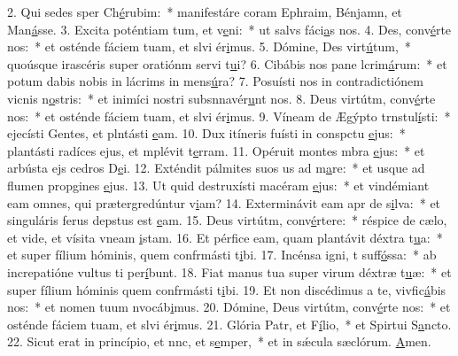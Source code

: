 2. Qui sedes sper Ch\uline{é}rubim:~* manifestáre coram Ephraim, Bénjamn, et Man\uline{á}sse.
3. Excita poténtiam tum, et v\uline{e}ni:~* ut salvs fáci\uline{a}s nos.
4. Des, conv\uline{é}rte nos:~* et osténde fáciem tuam, et slvi ér\uline{i}mus.
5. Dómine, Des virt\uline{ú}tum,~* quoúsque irascéris super oratiónm servi t\uline{u}i?
6. Cibábis nos pane lcrim\uline{á}rum:~* et potum dabis nobis in lácrims in mens\uline{ú}ra?
7. Posuísti nos in contradictiónem vicnis n\uline{o}stris:~* et inimíci nostri subsnnavér\uline{u}nt nos.
8. Deus virtútm, conv\uline{é}rte nos:~* et osténde fáciem tuam, et slvi ér\uline{i}mus.
9. Víneam de Ægýpto trnstul\uline{í}sti:~* ejecísti Gentes, et plntásti \uline{e}am.
10. Dux itíneris fuísti in conspctu \uline{e}jus:~* plantásti radíces ejus, et mplévit t\uline{e}rram.
11. Opéruit montes mbra \uline{e}jus:~* et arbústa ejs cedros D\uline{e}i.
12. Exténdit pálmites suos us ad m\uline{a}re:~* et usque ad flumen propgines \uline{e}jus.
13. Ut quid destruxísti macéram \uline{e}jus:~* et vindémiant eam omnes, qui prætergredúntur v\uline{i}am?
14. Exterminávit eam apr de s\uline{i}lva:~* et singuláris ferus depstus est \uline{e}am.
15. Deus virtútm, conv\uline{é}rtere:~* réspice de cælo, et vide, et vísita vneam \uline{i}stam.
16. Et pérfice eam, quam plantávit déxtra t\uline{u}a:~* et super fílium hóminis, quem confrmásti t\uline{i}bi.
17. Incénsa igni, t suff\uline{ó}ssa:~* ab increpatióne vultus ti per\uline{í}bunt.
18. Fiat manus tua super virum déxtræ t\uline{u}æ:~* et super fílium hóminis quem confrmásti t\uline{i}bi.
19. Et non discédimus a te, vivfic\uline{á}bis nos:~* et nomen tuum nvocáb\uline{i}mus.
20. Dómine, Deus virtútm, conv\uline{é}rte nos:~* et osténde fáciem tuam, et slvi ér\uline{i}mus.
21. Glória Patr, et F\uline{í}lio,~* et Spirtui S\uline{a}ncto.
22. Sicut erat in princípio, et nnc, et s\uline{e}mper,~* et in sǽcula sæclórum. \uline{A}men.

